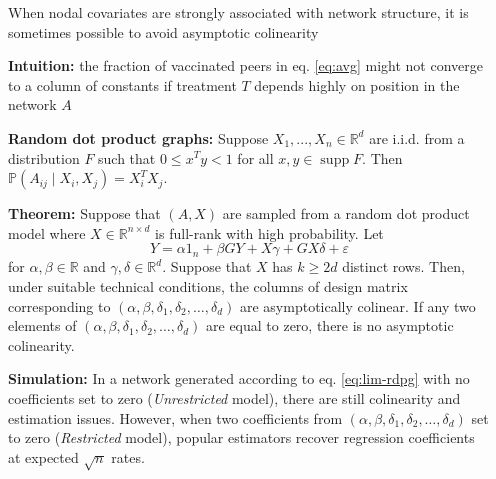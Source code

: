\documentclass[final]{beamer}
\newcommand{\R}{\mathbb{R}}
\DeclareMathOperator*{\supp}{supp}
\newlength{\sepwidth}
\newlength{\colwidth}
\newcommand{\separatorcolumn}{\begin{column}{\sepwidth}\end{column}}
\begin{document}
\begin{frame}[t]
\begin{columns}[t]
        \separatorcolumn

        \begin{column}{\colwidth}
            \begin{block}{When nodal covariates are strongly associated with network structure, it is sometimes possible to avoid asymptotic colinearity}

                \textbf{Intuition:} the fraction of vaccinated peers in eq. \eqref{eq:avg} might not converge to a column of constants if treatment $T$ depends highly on position in the network $A$

                \textbf{Random dot product graphs:} Suppose $X_1, ..., X_n \in \R^d$ are i.i.d. from a distribution $F$ such that $0 \le x^T y < 1$ for all $x,y \in \supp F$. Then $\mathbb{P}(A_{ij} \mid X_i, X_j) = X_i^T X_j$.

                \textbf{Theorem:} Suppose that $(A, X)$ are sampled from a random dot product model where $X \in \mathbb{R}^{n \times d}$ is full-rank with high probability. Let
                \begin{equation} \label{eq:lim-rdpg}
                    Y = \alpha 1_n + \beta G Y + X \gamma + G X \delta + \varepsilon
                \end{equation}
                for $\alpha, \beta \in \R$ and $\gamma, \delta \in \R^d$. Suppose that $X$ has $k \ge 2d$ distinct rows. Then, under suitable technical conditions, the columns of design matrix corresponding to $(\alpha, \beta, \delta_1, \delta_2, \dots, \delta_d)$ are asymptotically colinear. If any two elements of $(\alpha, \beta, \delta_1, \delta_2, \dots, \delta_d)$ are equal to zero, there is no asymptotic colinearity.

                \textbf{Simulation:} In a network generated according to eq. \eqref{eq:lim-rdpg} with no coefficients set to zero (\emph{Unrestricted} model), there are still colinearity and estimation issues. However, when two coefficients from $(\alpha, \beta, \delta_1, \delta_2, \dots, \delta_d)$ set to zero (\emph{Restricted} model), popular estimators recover regression coefficients at expected $\sqrt{n}$ rates.


\end{block}
\end{column}
\end{columns}
\end{frame}
\end{document}
